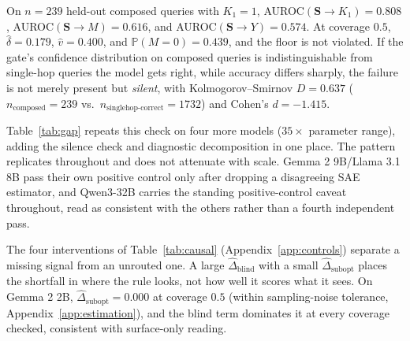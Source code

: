 \documentclass{article}
\newcommand{\gate}{\mathbf{S}}
\begin{document}
On $n=239$ held-out composed queries with $K_1=1$, AUROC$(\gate\!\to\!K_1)=0.808$, AUROC$(\gate\!\to\!M)=0.616$,
and AUROC$(\gate\!\to\!Y)=0.574$. At coverage $0.5$, $\widehat\delta=0.179$, $\hat v=0.400$, and
$\mathbb{P}(M=0)=0.439$, and the floor is not violated. If the gate's confidence distribution on
composed queries is indistinguishable from single-hop queries the model gets right, while accuracy
differs sharply, the failure is not merely present but \emph{silent}, with Kolmogorov--Smirnov
$D=0.637$ ($n_{\text{composed}}=239$ vs.\ $n_{\text{singlehop-correct}}=1732$) and Cohen's
$d=-1.415$.

Table~\ref{tab:gap} repeats this check on four more models ($35\times$ parameter range), adding the
silence check and diagnostic decomposition in one place. The pattern replicates throughout and does
not attenuate with scale. Gemma 2 9B/Llama 3.1 8B pass their own positive control only after dropping
a disagreeing SAE estimator, and Qwen3-32B carries the standing positive-control caveat throughout,
read as consistent with the others rather than a fourth independent pass.

The four interventions of Table~\ref{tab:causal} (Appendix~\ref{app:controls}) separate a missing
signal from an unrouted one. A large $\widehat{\Delta}_{\mathrm{blind}}$ with a small
$\widehat{\Delta}_{\mathrm{subopt}}$ places the shortfall in where the rule looks, not how well it
scores what it sees. On Gemma 2 2B, $\widehat{\Delta}_{\mathrm{subopt}}=0.000$ at coverage $0.5$
(within sampling-noise tolerance, Appendix~\ref{app:estimation}), and the blind term dominates it at
every coverage checked, consistent with surface-only reading.
\end{document}
